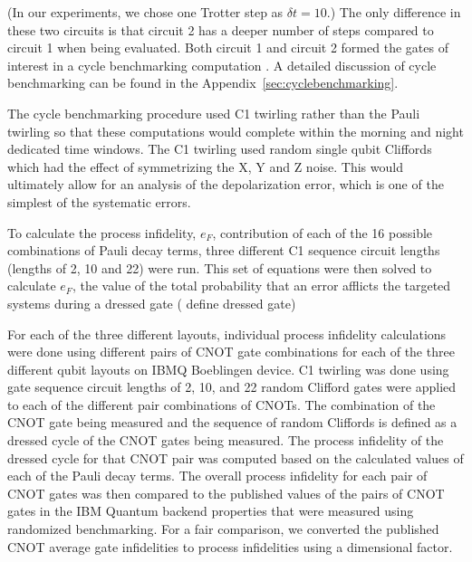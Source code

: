 (In our experiments, we chose one Trotter step as $\delta t=10$.)  The only difference in these two circuits is that circuit 2 has a deeper number of steps  compared to circuit 1 when being evaluated. Both circuit 1 and circuit 2 formed the gates of interest in a  cycle benchmarking computation \cite{CB-Nat-Comm-2019}.  A detailed discussion of cycle benchmarking can be found in the Appendix~\ref{sec:cyclebenchmarking}. 

The cycle benchmarking procedure used C1 twirling rather than the Pauli twirling so that these computations would complete within the morning and night dedicated time windows. The C1 twirling used random single qubit Cliffords which had the effect of symmetrizing the X, Y and Z noise.  This would ultimately allow for an analysis of the depolarization error, which is one of the simplest of the systematic errors.  

To calculate the process infidelity, $e_F$, contribution of each of the 16 possible combinations of Pauli decay terms, three different C1 sequence circuit lengths (lengths of 2, 10 and 22) were run.  This set of equations were then solved to calculate $e_{F}$, the value of the total probability that an error afflicts the targeted systems during a dressed gate ( 
define dressed gate)

For each of the three different layouts, individual process infidelity calculations were done using different pairs of CNOT gate combinations for each of the three different qubit layouts on IBMQ Boeblingen device.  C1 twirling was done using gate sequence circuit lengths of 2, 10, and 22 random Clifford gates were applied to each of the different pair combinations of CNOTs.  The combination of the CNOT gate being measured and the sequence of random Cliffords is defined as a dressed cycle of the CNOT gates being measured.  The process infidelity of the dressed cycle for that CNOT pair {\color{red}{KYA: why do we say the CNOT pair? CB was done on individual CNOTs.}} was computed based on the calculated values of each of the Pauli decay terms.  The overall process infidelity for each pair of CNOT gates was then compared to the published values of the pairs of CNOT gates in the IBM Quantum backend properties that were measured using randomized benchmarking. For a fair comparison, we converted the published CNOT average gate infidelities to process infidelities using a dimensional factor.  




